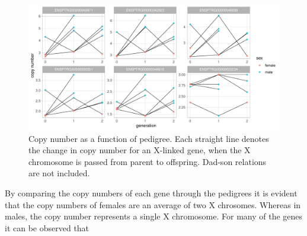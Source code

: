 \begin{figure}[h] 
  \centering
  \includegraphics[scale=0.78]{figures/fig_pedigree_CN_3.pdf}
  \caption{Copy number as a function of pedigree. Each straight line denotes the change in copy number for an X-linked gene, when the X chromosome is passed from parent to offspring. Dad-son relations are not included.}
  \label{fig:pedigree_CN}
\end{figure}



By comparing the copy numbers of each gene through the pedigrees it is evident that the copy numbers of females are an average of two X chrosomes. Whereas in males, the copy number represents a single X chromosome. For many of the genes it can be observed that 


